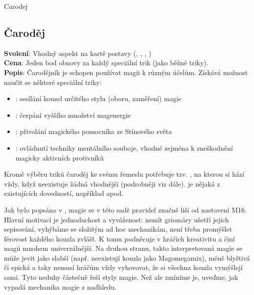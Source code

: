 \documentclass[../main.tex]{subfiles}
\begin{document}
\begin{Povolani}{Carodej}
\subsection{Čaroděj}
\label{sec:pov-carodej}
\textbf{Svolení}: Vhodný aspekt na kartě postavy (, , , )\\
\textbf{Cena}: Jeden bod obnovy za každý speciální trik (jako běžné triky). \\
\textbf{Popis}: Čarodějník je schopen používat magii k různým účelům. Získává možnost naučit se některé speciální triky:
\begin{itemize}
\item {}: sesílání kouzel určitého stylu (oboru, zaměření) magie
\item {}: čerpání vyššího množství magenergie
\item {}: přivolání magického pomocníka ze Stínového světa
\item {}: ovládnutí techniky mentálního souboje, vhodné zejména k zneškodnění magicky aktivních protivníků
\end{itemize}
Kromě výběru triků čaroděj ke svému řemeslu potřebuje tzv. , na kterou si hází vždy, když neexistuje žádná vhodnější (podrobněji viz dále).  je nějaká z existujících dovedností, například  apod. 
\end{Povolani}
Jak bylo popsáno v , magie se v této sadě pravidel značně liší od nastavení M16. Hlavní motivací je jednoduchost a vyváženost: nemít griomáry ušetří jejich sepisování, vyhýbáme se složitým ad hoc mechanikám, není třeba promýšlet férovost každého kouzla zvlášť. K tomu podněcuje v hráčích kreativitu a činí magii mnohem univerzálnější. Na druhou stranu, takto interpretovaná magie se může jevit jako slabší (např. neexistují kouzla jako Magomegamix), méně blyštivá či epická a taky nemusí hráčům vždy vyhovovat, že si všechna kouzla vymýšlejí sami. Tyto neduhy částečně řeší styly magie. Než ale zmíníme je, uveďme, jak vypadá mechanika magie z nadhledu.\\
\end{document}
